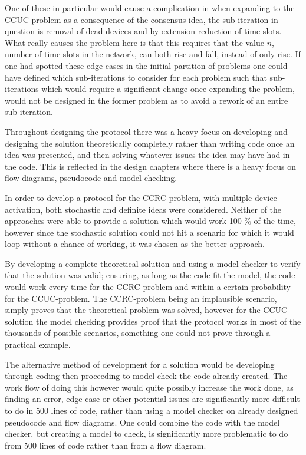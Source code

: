 One of these in particular would cause a complication in when expanding to the CCUC-problem as a consequence of the consensus idea, the sub-iteration in question is removal of dead devices and by extension reduction of time-slots.
What really causes the problem here is that this requires that the value $n$, number of time-slots in the network, can both rise and fall, instead of only rise.
If one had spotted these edge cases in the initial partition of problems one could have defined which sub-iterations to consider for each problem such that sub-iterations which would require a significant change once expanding the problem, would not be designed in the former problem as to avoid a rework of an entire sub-iteration.

\bigskip \noindent
Throughout designing the protocol there was a heavy focus on developing and designing the solution theoretically completely rather than writing code once an idea was presented, and then solving whatever issues the idea may have had in the code.
This is reflected in the design chapters where there is a heavy focus on flow diagrams, pseudocode and model checking.

In order to develop a protocol for the CCRC-problem, with multiple device activation, both stochastic and definite ideas were considered.
Neither of the approaches were able to provide a solution which would work 100 \% of the time, however since the stochastic solution could not hit a scenario for which it would loop without a chance of working, it was chosen as the better approach.

By developing a complete theoretical solution and using a model checker to verify that the solution was valid; ensuring, as long as the code fit the model, the code would work every time for the CCRC-problem and within a certain probability for the CCUC-problem.
The CCRC-problem being an implausible scenario, simply proves that the theoretical problem was solved, however for the CCUC-solution the model checking provides proof that the protocol works in most of the thousands of possible scenarios, something one could not prove through a practical example.

The alternative method of development for a solution would be developing through coding then proceeding to model check the code already created.
The work flow of doing this however would quite possibly increase the work done, as finding an error, edge case or other potential issues are significantly more difficult to do in 500 lines of code, rather than using a model checker on already designed pseudocode and flow diagrams.
One could combine the code with the model checker, but creating a model to check, is significantly more problematic to do from 500 lines of code rather than from a flow diagram.


